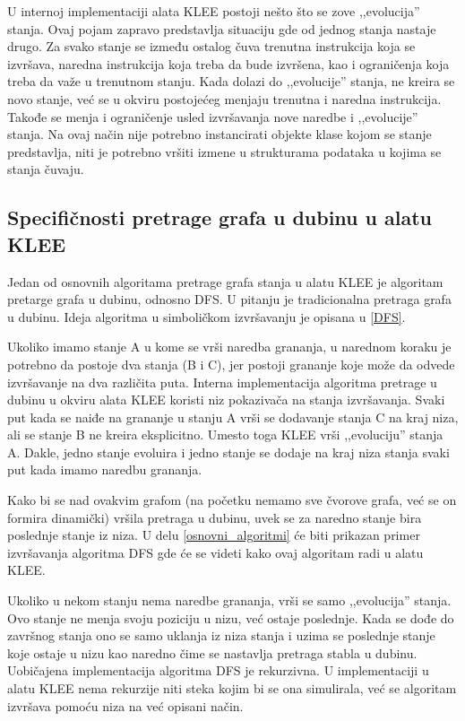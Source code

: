 \documentclass[12pt,oneside]{memoir}
\begin{document}
U internoj implementaciji alata KLEE postoji nešto što se zove ,,evolucija'' stanja. Ovaj pojam zapravo predstavlja situaciju gde od jednog stanja nastaje drugo. Za svako stanje se između ostalog čuva trenutna instrukcija koja se izvršava, naredna instrukcija koja treba da bude izvršena, kao i ograničenja koja treba da važe u trenutnom stanju. Kada dolazi do ,,evolucije'' stanja, ne kreira se novo stanje, već se u okviru postojećeg menjaju trenutna i naredna instrukcija. Takođe se menja i ograničenje usled izvršavanja nove naredbe i ,,evolucije'' stanja. Na ovaj način nije potrebno instancirati objekte klase kojom se stanje predstavlja, niti je potrebno vršiti izmene u strukturama podataka u kojima se stanja čuvaju.

\subsection{Specifičnosti pretrage grafa u dubinu u alatu KLEE}
Jedan od osnovnih algoritama pretrage grafa stanja u alatu KLEE je algoritam pretarge grafa u dubinu, odnosno DFS. U pitanju je tradicionalna pretraga grafa u dubinu. Ideja algoritma u simboličkom izvršavanju je opisana u \ref{DFS}.

Ukoliko imamo stanje A u kome se vrši naredba grananja, u narednom koraku je potrebno da postoje dva stanja (B i C), jer postoji grananje koje može da odvede izvršavanje na dva različita puta. Interna implementacija algoritma pretrage u dubinu u okviru alata KLEE koristi niz pokazivača na stanja izvršavanja. Svaki put kada se naiđe na grananje u stanju A vrši se dodavanje stanja C na kraj niza, ali se stanje B ne kreira eksplicitno. Umesto toga KLEE vrši ,,evoluciju'' stanja A. Dakle, jedno stanje evoluira i jedno stanje se dodaje na kraj niza stanja svaki put kada imamo naredbu grananja. 

Kako bi se nad ovakvim grafom (na početku nemamo sve čvorove grafa, već se on formira dinamički) vršila pretraga u dubinu, uvek se za naredno stanje bira poslednje stanje iz niza. U delu \ref{osnovni_algoritmi} će biti prikazan primer izvršavanja algoritma DFS gde će se videti kako ovaj algoritam radi u alatu KLEE. 

Ukoliko u nekom stanju nema naredbe grananja, vrši se samo ,,evolucija'' stanja. Ovo stanje ne menja svoju poziciju u nizu, već ostaje poslednje. Kada se dođe do završnog stanja ono se samo uklanja iz niza stanja i uzima se poslednje stanje koje ostaje u nizu kao naredno čime se nastavlja pretraga stabla u dubinu. Uobičajena implementacija algoritma DFS je rekurzivna. U implementaciji u alatu KLEE nema rekurzije niti steka kojim bi se ona simulirala, već se algoritam izvršava pomoću niza na već opisani način.
\end{document}
